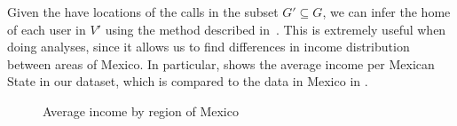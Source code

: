 Given the have locations of the calls in the subset $G' \subseteq G$, we can infer the home of each user in $V'$ using the method described in~\cite{csaji2013}. This is extremely useful when doing analyses, since it allows us to find differences in income distribution between areas of Mexico. In particular,  shows the average income per Mexican State in our dataset, which is compared to the data in Mexico in .

\begin{figure}
\centering
{}
\caption{Average income by region of Mexico}
\label{fig:regions}
\end{figure}

